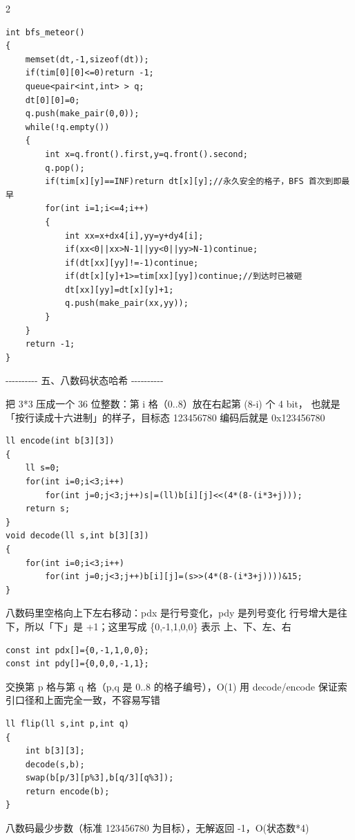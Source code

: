 \documentclass[UTF8,fontset=fandol,a4paper,twoside]{ctexart}
\newcommand{\note}[1]{{\fontsize{10}{12}\selectfont #1\par}}
\begin{document}
\begin{multicols}{2}
\begin{lstlisting}
int bfs_meteor()
{
    memset(dt,-1,sizeof(dt));
    if(tim[0][0]<=0)return -1;
    queue<pair<int,int> > q;
    dt[0][0]=0;
    q.push(make_pair(0,0));
    while(!q.empty())
    {
        int x=q.front().first,y=q.front().second;
        q.pop();
        if(tim[x][y]==INF)return dt[x][y];//永久安全的格子，BFS 首次到即最早
        for(int i=1;i<=4;i++)
        {
            int xx=x+dx4[i],yy=y+dy4[i];
            if(xx<0||xx>N-1||yy<0||yy>N-1)continue;
            if(dt[xx][yy]!=-1)continue;
            if(dt[x][y]+1>=tim[xx][yy])continue;//到达时已被砸
            dt[xx][yy]=dt[x][y]+1;
            q.push(make_pair(xx,yy));
        }
    }
    return -1;
}
\end{lstlisting}
\note{-\allowbreak{}-\allowbreak{}-\allowbreak{}-\allowbreak{}-\allowbreak{}-\allowbreak{}-\allowbreak{}-\allowbreak{}-\allowbreak{}-\allowbreak{} 五、八数码状态哈希 -\allowbreak{}-\allowbreak{}-\allowbreak{}-\allowbreak{}-\allowbreak{}-\allowbreak{}-\allowbreak{}-\allowbreak{}-\allowbreak{}-\allowbreak{}}
\note{把 3*3 压成一个 36 位整数：第 i 格（0.\allowbreak{}.\allowbreak{}8）放在右起第 (\allowbreak{}8-\allowbreak{}i)\allowbreak{} 个 4 bit， 也就是「按行读成十六进制」的样子，目标态 123456780 编码后就是 0x123456780}
\begin{lstlisting}
ll encode(int b[3][3])
{
    ll s=0;
    for(int i=0;i<3;i++)
        for(int j=0;j<3;j++)s|=(ll)b[i][j]<<(4*(8-(i*3+j)));
    return s;
}
void decode(ll s,int b[3][3])
{
    for(int i=0;i<3;i++)
        for(int j=0;j<3;j++)b[i][j]=(s>>(4*(8-(i*3+j))))&15;
}
\end{lstlisting}
\note{八数码里空格向上下左右移动：pdx 是行号变化，pdy 是列号变化 行号增大是往下，所以「下」是 +\allowbreak{}1；这里写成 \{0,\allowbreak{}-\allowbreak{}1,\allowbreak{}1,\allowbreak{}0,\allowbreak{}0\} 表示 上、下、左、右}
\begin{lstlisting}
const int pdx[]={0,-1,1,0,0};
const int pdy[]={0,0,0,-1,1};
\end{lstlisting}
\note{交换第 p 格与第 q 格（p,\allowbreak{}q 是 0.\allowbreak{}.\allowbreak{}8 的格子编号），O(\allowbreak{}1)\allowbreak{} 用 decode/\allowbreak{}encode 保证索引口径和上面完全一致，不容易写错}
\begin{lstlisting}
ll flip(ll s,int p,int q)
{
    int b[3][3];
    decode(s,b);
    swap(b[p/3][p%3],b[q/3][q%3]);
    return encode(b);
}
\end{lstlisting}
\note{八数码最少步数（标准 123456780 为目标），无解返回 -\allowbreak{}1，O(\allowbreak{}状态数*4)\allowbreak{}}

\end{multicols}
\end{document}
